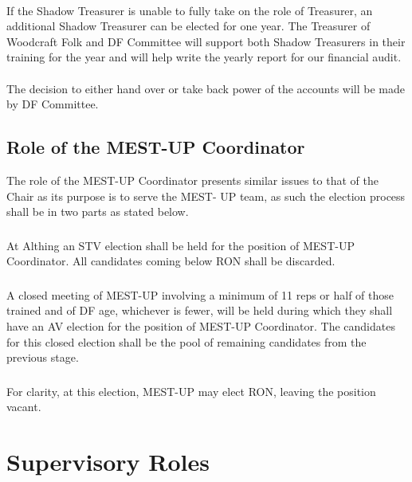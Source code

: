 \documentclass[a4paper, 11pt]{report}
\begin{document}
\paragraph{} If the Shadow Treasurer is unable to fully take on the role of Treasurer, an additional Shadow Treasurer can be elected for one year. The Treasurer of Woodcraft Folk and DF Committee will support both Shadow Treasurers in their training for the year and will help write the yearly report for our financial audit.
\paragraph{} The decision to either hand over or take back power of the accounts will be made by DF Committee.

\subsection{Role of the MEST-UP Coordinator}
\label{sec:mestup}

The role of the MEST-UP Coordinator presents similar issues to that of the Chair as its purpose is to serve the MEST- UP team, as such the election process shall be in two parts as stated below.

\subsubsection{}
At Althing an STV election shall be held for the position of MEST-UP Coordinator. All candidates coming below RON shall be discarded.

\subsubsection{}
A closed meeting of MEST-UP involving a minimum of 11 reps or half of those trained and of DF age, whichever is fewer, will be held during which they shall have an AV election for the position of MEST-UP Coordinator. The candidates for this closed election shall be the pool of remaining candidates from the previous stage.

\subsubsection{}
For clarity, at this election, MEST-UP may elect RON, leaving the position vacant.

\section{Supervisory Roles}
\end{document}
